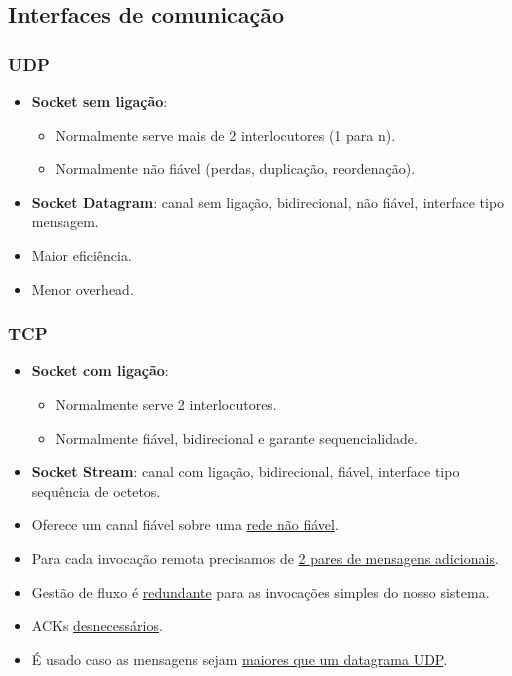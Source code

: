 \documentclass[12pt]{article}
\begin{document}
\subsection{Interfaces de comunicação}

\subsubsection{UDP}

\begin{itemize}[topsep=0pt, itemsep=0pt]
    \item \textbf{Socket sem ligação}: 
     \begin{itemize}[topsep=0pt, itemsep=0pt]
        \item Normalmente serve mais de 2 interlocutores (1 para n).
        \item Normalmente não fiável (perdas, duplicação, reordenação).
     \end{itemize}
    \item \textbf{Socket Datagram}: canal sem ligação, bidirecional, não fiável, interface tipo mensagem.
    \item Maior eficiência.
    \item Menor overhead.
\end{itemize}

\subsubsection{TCP}

\begin{itemize}[topsep=0pt, itemsep=0pt]
    \item \textbf{Socket com ligação}: 
    \begin{itemize}[topsep=0pt, itemsep=0pt]
        \item Normalmente serve 2 interlocutores.
        \item Normalmente fiável, bidirecional e garante sequencialidade.
    \end{itemize}
    \item \textbf{Socket Stream}: canal com ligação, bidirecional, fiável, interface tipo sequência de octetos.
    \item Oferece um canal fiável sobre uma \underline{rede não fiável}.
    \item Para cada invocação remota precisamos de \underline{2 pares de mensagens adicionais}.
    \item Gestão de fluxo é \underline{redundante} para as invocações simples do nosso sistema.
    \item ACKs \underline{desnecessários}.
    \item É usado caso as mensagens sejam \underline{maiores que um datagrama UDP}.
\end{itemize}
\end{document}
